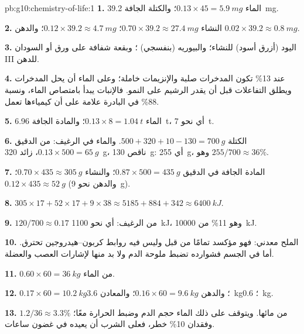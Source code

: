 \begin{solution}{pb:g10:chemistry-of-life:1}
\textbf{1.} الماء $0.13 \times 45 = \qty{5.9}{mg}$؛ والكتلة الجافة
\qty{39.2}{mg}.

\textbf{2.} النشاء $0.70 \times 39.2 \approx \qty{27.4}{mg}$؛ 
$0.12 \times 39.2 \approx \qty{4.7}{mg}$؛ والدهن $0.02 \times 39.2
\approx \qty{0.8}{mg}$.

\textbf{3.} اليود (أزرق أسود) للنشاء؛ والبيوريه (بنفسجي) ؛
وبقعة شفافة على ورق أو السودان III للدهن.

\textbf{4.} عند 13\% تكون المدخرات صلبة والإنزيمات خاملة؛ وعلى الماء
أن يحل المدخرات ويطلق التفاعلات قبل أن يقدر الرشيم على النمو. فالإنبات
يبدأ بامتصاص الماء، ونسبة 88\% في البادرة علامة على أن كيمياءها تعمل.

\textbf{5.} الماء $0.13 \times 8 = \qty{1.04}{t}$؛ والمادة الجافة
\qty{6.96}{t}، أي نحو \qty{7}{t}.

\textbf{6.} الكتلة $500 + 320 + 10 - 130 = \qty{700}{g}$. والماء في
الرغيف: من الدقيق $0.13 \times 500 = \qty{65}{g}$، زائد \qty{320}{g}،
ناقص \qty{130}{g}: أي \qty{255}{g}، وهو $255/700 \approx 36\%$.

\textbf{7.} المادة الجافة في الدقيق $0.87 \times 500 = \qty{435}{g}$؛
والنشاء $0.70 \times 435 \approx \qty{305}{g}$؛  $0.12 \times 435 \approx
\qty{52}{g}$ (والدهن نحو \qty{9}{g}).

\textbf{8.} $305 \times 17 + 52 \times 17 + 9 \times 38 \approx 5185 +
884 + 342 \approx \qty{6400}{kJ}$.

\textbf{9.} $120/700 \approx 0.17$ من الرغيف: أي نحو \qty{1100}{kJ}،
وهو 11\% من \qty{10000}{kJ}.

\textbf{10.} الملح معدني: فهو مؤكسد تمامًا من قبل وليس فيه روابط
كربون--هيدروجين تحترق. أما في الجسم فشوارده تضبط ملوحة الدم ولا بد
منها لإشارات العصب والعضلة.

\textbf{11.} $0.60 \times 60 = \qty{36}{kg}$ من الماء.

\textbf{12.}  $0.17 \times 60 = \qty{10.2}{kg}$؛ والدهن $0.16
\times 60 = \qty{9.6}{kg}$؛ والمعادن \qty{3.6}{kg}؛ 
\qty{0.6}{kg}.

\textbf{13.} $1.2/36 \approx 3.3\%$ من مائها. ويتوقف على ذلك الماء حجم
الدم وضبط الحرارة معًا؛ وفقدان 10\% خطر، فعلى الشرب أن يعيده في غضون
ساعات.


\end{solution}

